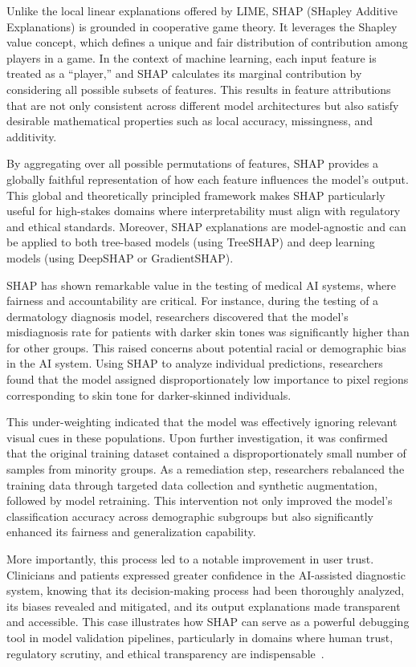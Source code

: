 \documentclass[manuscript,screen,review]{acmart}
\begin{document}
Unlike the local linear explanations offered by LIME, SHAP (SHapley Additive Explanations) is grounded in cooperative game theory. It leverages the Shapley value concept, which defines a unique and fair distribution of contribution among players in a game. In the context of machine learning, each input feature is treated as a “player,” and SHAP calculates its marginal contribution by considering all possible subsets of features. This results in feature attributions that are not only consistent across different model architectures but also satisfy desirable mathematical properties such as local accuracy, missingness, and additivity.

By aggregating over all possible permutations of features, SHAP provides a globally faithful representation of how each feature influences the model’s output. This global and theoretically principled framework makes SHAP particularly useful for high-stakes domains where interpretability must align with regulatory and ethical standards. Moreover, SHAP explanations are model-agnostic and can be applied to both tree-based models (using TreeSHAP) and deep learning models (using DeepSHAP or GradientSHAP).

SHAP has shown remarkable value in the testing of medical AI systems, where fairness and accountability are critical. For instance, during the testing of a dermatology diagnosis model, researchers discovered that the model’s misdiagnosis rate for patients with darker skin tones was significantly higher than for other groups. This raised concerns about potential racial or demographic bias in the AI system. Using SHAP to analyze individual predictions, researchers found that the model assigned disproportionately low importance to pixel regions corresponding to skin tone for darker-skinned individuals.

This under-weighting indicated that the model was effectively ignoring relevant visual cues in these populations. Upon further investigation, it was confirmed that the original training dataset contained a disproportionately small number of samples from minority groups. As a remediation step, researchers rebalanced the training data through targeted data collection and synthetic augmentation, followed by model retraining. This intervention not only improved the model’s classification accuracy across demographic subgroups but also significantly enhanced its fairness and generalization capability.

More importantly, this process led to a notable improvement in user trust. Clinicians and patients expressed greater confidence in the AI-assisted diagnostic system, knowing that its decision-making process had been thoroughly analyzed, its biases revealed and mitigated, and its output explanations made transparent and accessible. This case illustrates how SHAP can serve as a powerful debugging tool in model validation pipelines, particularly in domains where human trust, regulatory scrutiny, and ethical transparency are indispensable~\cite{Lundberg2017}.
\end{document}
